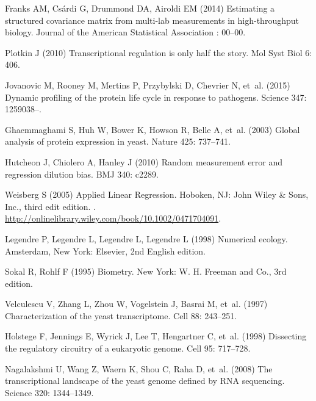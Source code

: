 \documentclass[10pt]{article}
\begin{document}
\begin{thebibliography}{10}
Franks AM, Cs{\'a}rdi G, Drummond DA, Airoldi EM (2014) Estimating a structured
  covariance matrix from multi-lab measurements in high-throughput biology.
\newblock Journal of the American Statistical Association : 00--00.

Plotkin J (2010) Transcriptional regulation is only half the story.
\newblock Mol Syst Biol 6: 406.

Jovanovic M, Rooney M, Mertins P, Przybylski D, Chevrier N, et~al. (2015)
  {Dynamic profiling of the protein life cycle in response to pathogens}.
\newblock Science 347: 1259038--.

Ghaemmaghami S, Huh W, Bower K, Howson R, Belle A, et~al. (2003) Global
  analysis of protein expression in yeast.
\newblock Nature 425: 737--741.

Hutcheon J, Chiolero A, Hanley J (2010) Random measurement error and regression
  dilution bias.
\newblock BMJ 340: c2289.

Weisberg S (2005) {Applied Linear Regression}.
\newblock Hoboken, NJ: John Wiley \& Sons, Inc., third edit edition.
\newblock {}.
\newblock
  \urlprefix\url{http://onlinelibrary.wiley.com/book/10.1002/0471704091}.

Legendre P, Legendre L, Legendre L, Legendre L (1998) Numerical ecology.
\newblock Amsterdam, New York: Elsevier, 2nd {E}nglish edition.

Sokal R, Rohlf F (1995) Biometry.
\newblock New York: W. H. Freeman and Co., 3rd edition.

Velculescu V, Zhang L, Zhou W, Vogelstein J, Basrai M, et~al. (1997)
  Characterization of the yeast transcriptome.
\newblock Cell 88: 243--251.

Holstege F, Jennings E, Wyrick J, Lee T, Hengartner C, et~al. (1998) Dissecting
  the regulatory circuitry of a eukaryotic genome.
\newblock Cell 95: 717--728.

Nagalakshmi U, Wang Z, Waern K, Shou C, Raha D, et~al. (2008) The
  transcriptional landscape of the yeast genome defined by {RNA} sequencing.
\newblock Science 320: 1344--1349.


\end{thebibliography}
\end{document}
